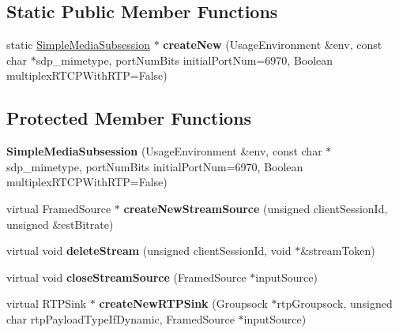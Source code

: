 \subsection*{Static Public Member Functions}
\begin{DoxyCompactItemize}
\item 
static \hyperlink{classSimpleMediaSubsession}{Simple\+Media\+Subsession} $\ast$ {\bfseries create\+New} (Usage\+Environment \&env, const char $\ast$sdp\+\_\+mimetype, port\+Num\+Bits initial\+Port\+Num=6970, Boolean multiplex\+R\+T\+C\+P\+With\+R\+TP=False)\hypertarget{classSimpleMediaSubsession_adc34ab9574a6ed91240fa829e6c2a5f9}{}\label{classSimpleMediaSubsession_adc34ab9574a6ed91240fa829e6c2a5f9}

\end{DoxyCompactItemize}
\subsection*{Protected Member Functions}
\begin{DoxyCompactItemize}
\item 
{\bfseries Simple\+Media\+Subsession} (Usage\+Environment \&env, const char $\ast$sdp\+\_\+mimetype, port\+Num\+Bits initial\+Port\+Num=6970, Boolean multiplex\+R\+T\+C\+P\+With\+R\+TP=False)\hypertarget{classSimpleMediaSubsession_a138fc3680387851d5bcf973555b80113}{}\label{classSimpleMediaSubsession_a138fc3680387851d5bcf973555b80113}

\item 
virtual Framed\+Source $\ast$ {\bfseries create\+New\+Stream\+Source} (unsigned client\+Session\+Id, unsigned \&est\+Bitrate)\hypertarget{classSimpleMediaSubsession_af89b24bdd0593d86ebbaf080abe6e27f}{}\label{classSimpleMediaSubsession_af89b24bdd0593d86ebbaf080abe6e27f}

\item 
virtual void {\bfseries delete\+Stream} (unsigned client\+Session\+Id, void $\ast$\&stream\+Token)\hypertarget{classSimpleMediaSubsession_ae8860a3c2f76d66c38bab610f876f3dc}{}\label{classSimpleMediaSubsession_ae8860a3c2f76d66c38bab610f876f3dc}

\item 
virtual void {\bfseries close\+Stream\+Source} (Framed\+Source $\ast$input\+Source)\hypertarget{classSimpleMediaSubsession_a88cdf48dd34d9b856bfa35ddd626df65}{}\label{classSimpleMediaSubsession_a88cdf48dd34d9b856bfa35ddd626df65}

\item 
virtual R\+T\+P\+Sink $\ast$ {\bfseries create\+New\+R\+T\+P\+Sink} (Groupsock $\ast$rtp\+Groupsock, unsigned char rtp\+Payload\+Type\+If\+Dynamic, Framed\+Source $\ast$input\+Source)\hypertarget{classSimpleMediaSubsession_a50a8947658acf0170aa66b9c9b00e3f1}{}\label{classSimpleMediaSubsession_a50a8947658acf0170aa66b9c9b00e3f1}

\end{DoxyCompactItemize}


